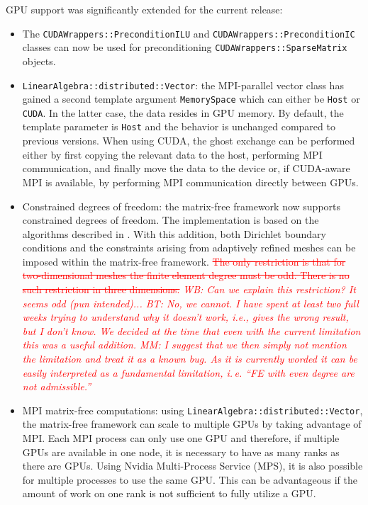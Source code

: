 \documentclass{ansarticle-preprint}
\begin{document}
GPU support was significantly extended for the current release:
\begin{itemize}
  \item The \texttt{CUDAWrappers::PreconditionILU} and \texttt{CUDAWrappers::PreconditionIC}
    classes can now be used for preconditioning \texttt{CUDAWrappers::SparseMatrix} objects.
  \item \texttt{LinearAlgebra::distributed::Vector}: the MPI-parallel vector
    class has gained a second template argument \texttt{MemorySpace} which can
    either be \texttt{Host} or \texttt{CUDA}. In the latter case, the data
    resides in GPU memory. By default, the template parameter is
    \texttt{Host} and the behavior is unchanged compared to previous versions.
    When using CUDA, the ghost exchange can be performed either by first copying
    the relevant data to the host, performing MPI communication, and finally
    move the data to the device or, if CUDA-aware MPI is available, by
    performing MPI communication directly between GPUs.
  \item Constrained degrees of freedom: the matrix-free framework now
    supports constrained degrees of freedom. The implementation is based on
    the algorithms described in \cite{ljungkvist2017}. With this addition,
    both Dirichlet boundary conditions and the constraints arising from
    adaptively refined meshes can be imposed within the matrix-free
    framework.
    \textcolor{red}{%
    \sout{The only restriction is that for two-dimensional meshes the
    finite element degree must be odd. There is no such restriction in
    three dimensions.}
    \emph{%
    WB: Can we explain this restriction? It seems odd (pun intended)...
    BT: No, we cannot. I have spent at least two full weeks trying to
    understand why it doesn't work, i.e., gives the wrong result, but I
    don't know. We decided at the time that even with the current
    limitation this was a useful addition.
    MM: I suggest that we then simply not mention the limitation and treat
    it as a known bug. As it is currently worded it can be easily
    interpreted as a fundamental limitation, i.\,e. ``FE with even degree
    are not admissible.''}}

  \item MPI matrix-free computations: using \texttt{LinearAlgebra::distributed::Vector}, the
    matrix-free framework can scale to multiple GPUs by taking
    advantage of MPI. Each MPI process can only use one GPU and therefore, if
    multiple GPUs are available in one node, it is necessary to have as many
    ranks as there are GPUs. Using Nvidia Multi-Process Service (MPS), it is also possible
    for multiple processes to use the same GPU. This can be advantageous if the
    amount of work on one rank is not sufficient to fully utilize a GPU.
\end{itemize}
\end{document}
